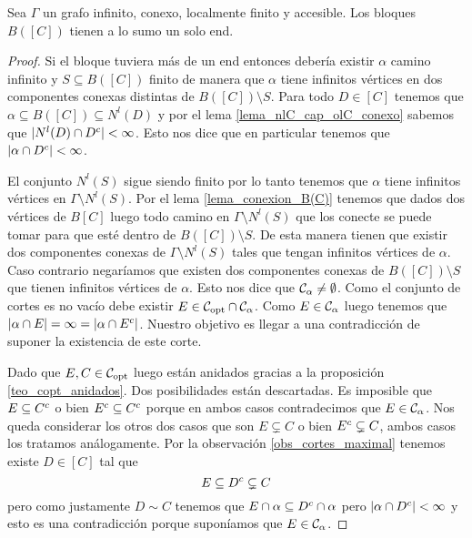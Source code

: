 \documentclass[tesis.tex]{subfiles}
\begin{document}
\begin{lema}\label{lema_bloques_1_end}
	Sea $\Gamma$ un grafo infinito, conexo, localmente finito y accesible.
	Los bloques $B([C])$ tienen a lo sumo un solo end.
\end{lema}
\begin{proof}
	Si el bloque tuviera más de un end entonces debería existir $\alpha$ camino infinito y $S \subseteq B([C])$ finito de manera que $\alpha$ tiene infinitos vértices en dos componentes conexas distintas de $B([C]) \setminus S$.
	Para todo $D \in [C]$ tenemos que $\alpha \subseteq B([C]) \subseteq N^l(D)$ y por el lema \ref{lema_nlC_cap_olC_conexo} sabemos que $|N^l(D) \cap D^{c} | < \infty$.
	Esto nos dice que en particular tenemos que $|\alpha \cap D^{c}| < \infty$.
	
	El conjunto $N^l(S)$ sigue siendo finito por lo tanto tenemos que $\alpha$ tiene infinitos vértices en $\Gamma \setminus N^l(S)$.
	Por el lema \ref{lema_conexion_B(C)} tenemos que dados dos vértices de $B[C]$ luego todo camino en $\Gamma \setminus N^l(S)$ que los conecte se puede tomar para que esté dentro de $B([C]) \setminus S$. 
	De esta manera tienen que existir dos componentes conexas de $\Gamma \setminus N^l(S)$ tales que tengan infinitos vértices de $\alpha$. 
	Caso contrario negaríamos que existen dos componentes conexas de $B([C]) \setminus S$ que tienen infinitos vértices de $\alpha$.
	Esto nos dice que ${\cal C}_{\alpha} \neq \emptyset$.
	Como el conjunto de cortes es no vacío debe existir $E \in {\cal C}_{\text{opt}} \cap {\cal C}_{\alpha}$.
	Como $E \in {\cal C}_{\alpha}$ luego tenemos que $|\alpha \cap E| = \infty = |\alpha \cap E^{c}|$.
	Nuestro objetivo es llegar a una contradicción de suponer la existencia de este corte. 	
	
	Dado que $E,C \in {\cal C}_{\text{opt}}$ luego están anidados gracias a la proposición \ref{teo_copt_anidados}.
	Dos posibilidades están descartadas. 
	Es imposible que $E \subseteq C^{c}$ o bien $E^{c} \subseteq C^{c}$ porque en ambos casos contradecimos que $E \in {\cal C}_{\alpha}$.
	Nos queda considerar los otros dos casos que son $E \subsetneq C$ o bien $E^{c} \subsetneq C$, ambos casos los tratamos análogamente.
	Por la observación \ref{obs_cortes_maximal} tenemos existe $D \in [C]$ tal que 
	\[
		E \subseteq D^{c} \subsetneq C
	\]
	pero como justamente $D \sim C$ tenemos que $E \cap \alpha \subseteq D^{c} \cap \alpha$ pero $|\alpha \cap D^{c}| < \infty$ y esto es una contradicción porque suponíamos que $E \in {\cal C}_{\alpha}$.
\end{proof}
\end{document}
